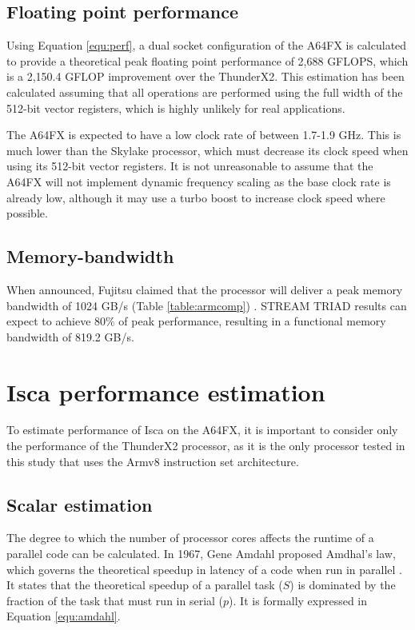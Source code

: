 \documentclass[a4paper,11pt]{report}
\begin{document}
\subsection{Floating point performance}
Using Equation \ref{equ:perf}, a dual socket configuration of the A64FX is calculated to provide a theoretical peak floating point performance of 2,688 GFLOPS, which is a 2,150.4 GFLOP improvement over the ThunderX2. This estimation has been calculated assuming that all operations are performed using the full width of the 512-bit vector registers, which is highly unlikely for real applications. 
\par
The A64FX is expected to have a low clock rate of between 1.7-1.9 GHz. This is much lower than the Skylake processor, which must decrease its clock speed when using its 512-bit vector registers. It is not unreasonable to assume that the A64FX will not implement dynamic frequency scaling as the base clock rate is already low, although it may use a turbo boost to increase clock speed where possible.

\subsection{Memory-bandwidth}
When announced, Fujitsu claimed that the processor will deliver a peak memory bandwidth of 1024 GB/s (Table \ref{table:armcomp}) \cite{yoshida2018fujitsu}. STREAM TRIAD results can expect to achieve 80\% of peak performance, resulting in a functional memory bandwidth of 819.2 GB/s. 

\section{Isca performance estimation}
To estimate performance of Isca on the A64FX, it is important to consider only the performance of the ThunderX2 processor, as it is the only processor tested in this study that uses the Armv8 instruction set architecture.


\subsection{Scalar estimation}
The degree to which the number of processor cores affects the runtime of a parallel code can be calculated. In 1967, Gene Amdahl proposed Amdhal's law, which governs the theoretical speedup in latency of a code when run in parallel \cite{amdahl1967validity}. It states that the theoretical speedup of a parallel task ($S$) is dominated by the fraction of the task that must run in serial ($p$). It is formally expressed in Equation \ref{equ:amdahl}.
\end{document}
